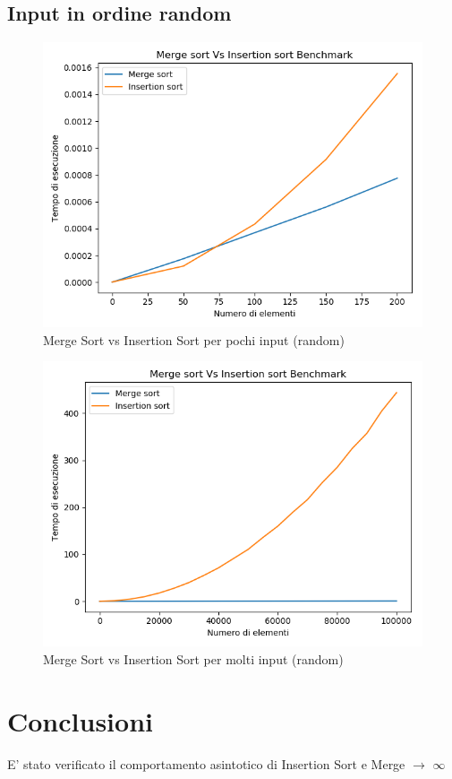 \documentclass[a4paper]{article}
\begin{document}
\subsection{Input in ordine random}		

		\begin{figure}[!htb]
		\centering
		\includegraphics[scale=0.3]{6}
		\caption{Merge Sort vs Insertion Sort per pochi input (random)}
		\label{fig:SmallInsMergeRandom}
		\end{figure}
		
		\begin{figure}[!htb]
		\centering
		\includegraphics[scale=0.3]{5}
		\caption{Merge Sort vs Insertion Sort per molti input (random)}
		\label{fig:BigInsMergeRandom}
		\end{figure}
		

\section{Conclusioni}
E' stato verificato il comportamento asintotico di Insertion Sort e Merge $\longrightarrow$  \(\infty\)
\end{document}
